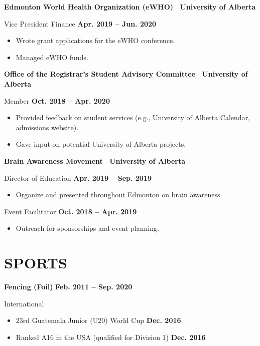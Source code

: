 \documentclass{article}
\begin{document}
    
    \textbf{Edmonton World Health Organization (eWHO) \textbar\ University of Alberta}

    Vice President Finance \hfill \textbf{Apr. 2019 -- Jun. 2020}
    \begin{itemize}
        \item Wrote grant applications for the eWHO conference.
        \item Managed eWHO funds.
    \end{itemize}
    

    \textbf{Office of the Registrar's  Student Advisory Committee \textbar\ University of Alberta}

    Member \hfill \textbf{Oct. 2018 -- Apr. 2020}
    \begin{itemize}
        \item Provided feedback on student services (e.g., University of Alberta Calendar, admissions website).
        \item Gave input on potential University of Alberta projects.
    \end{itemize}


    \textbf{Brain Awareness Movement \textbar\ University of Alberta}

    Director of Education \hfill \textbf{Apr. 2019 -- Sep. 2019}
    \begin{itemize}
        \item Organize and presented throughout Edmonton on brain awareness.
    \end{itemize}

    Event Facilitator \hfill \textbf{Oct. 2018 -- Apr. 2019}
    \begin{itemize}
        \item Outreach for sponsorships and event planning.
    \end{itemize}


\newpage


\section*{\textcolor{my_colour}{SPORTS}}
\vspace{-.25em} \hrulefill \vspace{.75em}

    \textbf{Fencing (Foil)} \hfill \textbf{Feb. 2011 -- Sep. 2020}

    International

    \begin{itemize}
        \item 23rd Guatemala Junior (U20) World Cup \hfill \textbf{Dec. 2016}
        \item Ranked A16 in the USA (qualified for Division 1) \hfill \textbf{Dec. 2016}
    \end{itemize}
\end{document}
